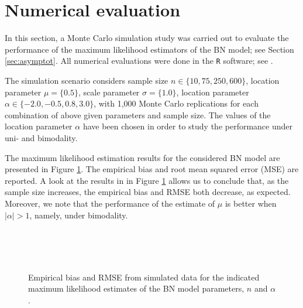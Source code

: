 \documentclass[12pt]{article}
\theoremstyle{definition}
\begin{document}
\section{Numerical evaluation}\label{sec:simulation}
In this section, a Monte Carlo simulation study was carried out to evaluate the performance of the 
maximum likelihood estimators of the BN model; see Section \ref{sec:asymptot}. All numerical evaluations were done in
the \texttt{R} software; see \cite{r:18}. 

The simulation scenario considers sample size $n \in \{10,75,250,600\}$, location parameter $\mu=\{0.5\}$, scale parameter $\sigma=\{1.0\}$, location parameter $\alpha \in \{-2.0,-0.5,0.8,3.0\}$, with 1,000 Monte Carlo replications for each combination of above given parameters and sample size. The values of the location parameter $\alpha$ have been chosen in order to study the performance under uni- and bimodality.

The maximum likelihood estimation results for the considered BN model are presented in Figure \ref{fig:estimates}. The empirical bias and root mean squared error (MSE) are reported. A look at the results in in Figure \ref{fig:estimates} allows us to conclude that, as the sample size increases, the empirical bias and RMSE both decrease, as expected. Moreover, we note that the performance of the estimate of $\mu$ is better when $|\alpha|>1$, namely, under bimodality. 









\begin{figure}[!ht]
\centering
%
\\
\\
\\
 \caption{\small {Empirical bias and RMSE from simulated data for the indicated maximum likelihood estimates of the BN 
model parameters, $n$ and $\alpha$.}}
\label{fig:estimates}
\end{figure}
\end{document}
